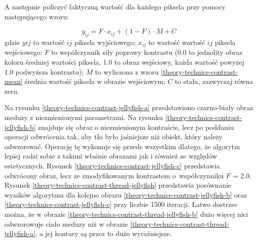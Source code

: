         A następnie policzyć faktyczną wartość dla każdego piksela przy pomocy następującego wzoru:
        
        \begin{equation} \label{theory-technics-contrast-equation}
            y_{ij} = F \cdot x_{ij} + (1-F) \cdot M + C
        \end{equation}
        gdzie \(y{ij}\) to wartość \(ij\) piksela wyjściowego; \(x_{ij}\) to wartość wartość \(ij\) piksela wejściowego; \(F\) to współczynnik siły poprawy kontrastu (0.0 to jednolity obraz koloru średniej wartości piksela, 1.0 to obraz wejściowy, każda wartość powyżej 1.0 podwyższa kontrastu); \(M\) to wyliczona z wzoru \eqref{theory-technics-contrast-mean} średnia wartość piksela w obrazie wejściowym; \(C\) to stała, zazwyczaj równa zeru.
        
        Na rysunku \ref{theory-technics-contrast-jellyfish-a} przedstawiono czarno-biały obraz meduzy z niezmienionymi parametrami. Na rysunku \ref{theory-technics-contrast-jellyfish-b} znajduje się obraz o niezmienionym kontraście, lecz po poddaniu operacji odwrócenia tak, aby tło było jaśniejsze niż obiekt, który należy odwzorować. Operację tę wykonuje się przede wszystkim dlatego, że algorytm lepiej radzi sobie z takimi właśnie obrazami jak i również ze względów estetycznych. Rysunek \ref{theory-technics-contrast-jellyfish-c} przedstawia odwrócony obraz, lecz ze zmodyfikowanym kontrastem o~współczynniku \(F\) = 2.0. Rysunek \ref{theory-technics-contrast-thread-jellyfish} przedstawia porównanie wyników algorytmu dla kolejno obrazu \ref{theory-technics-contrast-jellyfish-b} oraz \ref{theory-technics-contrast-jellyfish-c} przy liczbie 1500 iteracji. Łatwo dostrzec można, że w obrazie \ref{theory-technics-contrast-thread-jellyfish-b} dużo więcej nici odwzorowuje ciało meduzy niż w obrazie \ref{theory-technics-contrast-thread-jellyfish-a}, a jej kontury są przez to dużo wyraźniejsze.
        

